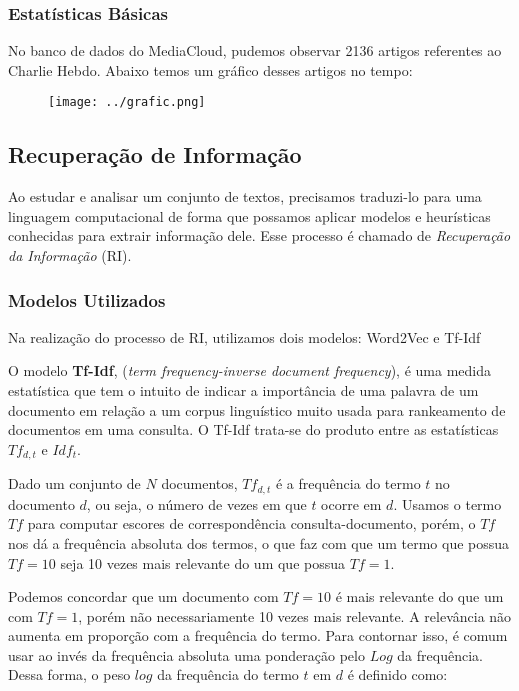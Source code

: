\documentclass[a4paper,12pt]{article}
\begin{document}
\subsubsection{Estatísticas Básicas}

No banco de dados do MediaCloud, pudemos observar 2136 artigos referentes ao Charlie Hebdo. Abaixo temos um gráfico desses artigos
no tempo:

\begin{figure}[h]
 \centering
 \texttt{[image: ../grafic.png]}
\end{figure}


  \pagebreak
\subsection{Recuperação de Informação}

  Ao estudar e analisar um conjunto de textos, precisamos traduzi-lo para uma linguagem computacional de forma que possamos aplicar modelos e heurísticas 
  conhecidas para extrair informação dele. Esse processo é chamado de \textit{Recuperação da Informação} (RI).
    
  
\subsubsection{Modelos Utilizados}

  Na realização do processo de RI, utilizamos dois modelos: Word2Vec e Tf-Idf
  
  O modelo \textbf{Tf-Idf}, (\textit{term frequency-inverse document frequency}), é uma medida estatística que tem o intuito de indicar
  a importância de uma palavra de um documento em relação a um corpus linguístico muito usada para rankeamento de documentos em uma consulta. O Tf-Idf trata-se do produto entre as estatísticas $Tf_{d,t}$ e
  $Idf_{t}$.
  
  Dado um conjunto de $N$ documentos, $Tf_{d,t}$ é a frequência do termo $t$ no documento
  $d$, ou seja, o número de vezes em que $t$ ocorre em $d$. Usamos o termo $Tf$ para computar escores de correspondência consulta-documento,
  porém, o $Tf$ nos dá a frequência absoluta dos termos, o que faz com que um termo que possua $Tf=10$ seja 10 vezes mais relevante do um que possua
  $Tf=1$. 
  
  Podemos concordar que um documento com $Tf=10$ é mais relevante do que um com $Tf=1$, porém não necessariamente 10 vezes mais relevante.
  A relevância não aumenta em proporção com a frequência do termo. Para contornar isso, é comum usar ao invés da frequência absoluta uma ponderação
  pelo $Log$ da frequência. Dessa forma, o peso $log$ da frequência do termo $t$ em $d$ é definido como:
  
\end{document}
